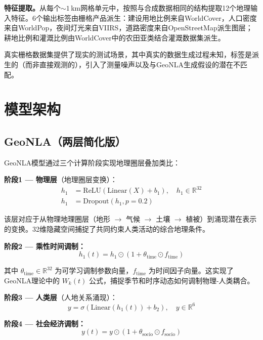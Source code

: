 \documentclass[a4paper,11pt]{article}
\begin{document}
\textbf{特征提取。}从每个${\sim}1$\,km网格单元中，按照与合成数据相同的结构提取12个地理输入特征。6个输出标签由栅格产品派生：建设用地比例来自WorldCover，人口密度来自WorldPop，夜间灯光来自VIIRS，道路密度来自OpenStreetMap派生图层；耕地比例和灌溉比例由WorldCover中的农田亚类结合灌溉数据集派生。

真实栅格数据集提供了现实的测试场景，其中真实的数据生成过程未知，标签是派生的（而非直接观测的），引入了测量噪声以及与GeoNLA生成假设的潜在不匹配。

\section{模型架构}
\label{sec:model_architecture}

\subsection{GeoNLA（两层简化版）}
\label{subsec:geonla}

GeoNLA模型通过三个计算阶段实现地理圈层叠加类比：

\textbf{阶段1 --- 物理层}（地理圈层变换）：
\begin{align}
    h_1 &= \text{ReLU}(\text{Linear}(X) + b_1), \quad h_1 \in \mathbb{R}^{32} \\
    h_1 &= \text{Dropout}(h_1, p=0.2)
\end{align}

该层对应于从物理地理圈层（地形 $\to$ 气候 $\to$ 土壤 $\to$ 植被）到涌现潜在表示的变换。32维隐藏空间捕捉了共同约束人类活动的综合地理条件。

\textbf{阶段2 --- 乘性时间调制：}
\begin{equation}
    h_1(t) = h_1 \odot (1 + \theta_{\text{time}} \odot f_{\text{time}})
\end{equation}

其中 $\theta_{\text{time}} \in \mathbb{R}^{32}$ 为可学习调制参数向量，$f_{\text{time}}$ 为时间因子向量。这实现了GeoNLA理论中的 $W_k(t)$ 公式，捕捉季节和时序动态如何调制物理-人类耦合。

\textbf{阶段3 --- 人类层}（人地关系涌现）：
\begin{equation}
    y = \sigma(\text{Linear}(h_1(t)) + b_2), \quad y \in \mathbb{R}^{6}
\end{equation}

\textbf{阶段4 --- 社会经济调制：}
\begin{equation}
    y(t) = y \odot (1 + \theta_{\text{socio}} \odot f_{\text{socio}})
\end{equation}
\end{document}
